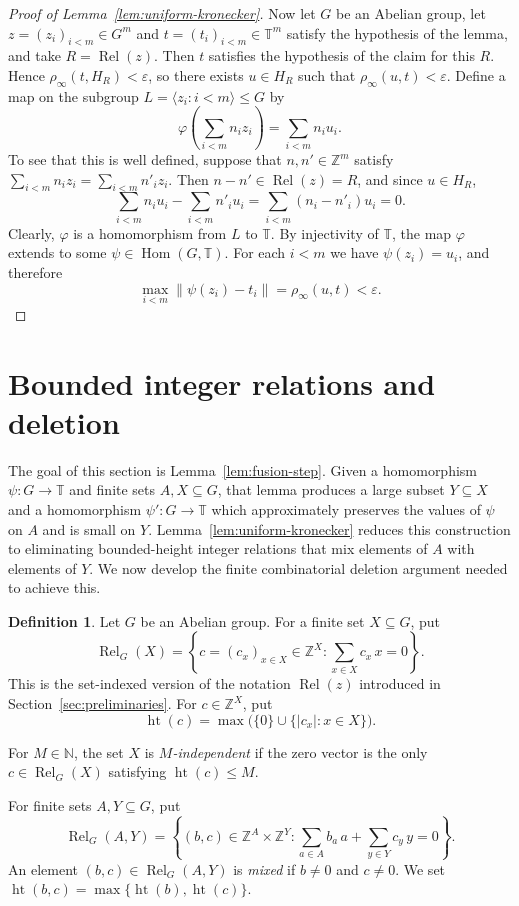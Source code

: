 \documentclass[11pt]{amsart}
\theoremstyle{definition}
\newtheorem{definition}[theorem]{Definition}
\newcommand{\T}{\mathbb T}
\newcommand{\N}{\mathbb N}
\newcommand{\Z}{\mathbb Z}
\newcommand{\Hom}{\operatorname{Hom}}
\newcommand{\Rel}{\operatorname{Rel}}
\newcommand{\htop}{\operatorname{ht}}
\begin{document}
\begin{proof}[Proof of Lemma~\ref{lem:uniform-kronecker}]
Now let $G$ be an Abelian group, let
$z=(z_i)_{i<m}\in G^m$ and
$t=(t_i)_{i<m}\in\T^m$ satisfy the hypothesis of the lemma, and take
$R=\Rel(z)$.
Then $t$ satisfies the hypothesis of the claim for this $R$.  Hence $\rho_\infty(t,H_R)<\varepsilon$, so there
exists $u\in H_R$ such that
$\rho_\infty(u,t)<\varepsilon$.  Define a map on the subgroup
$L=\langle z_i:i<m\rangle\leq G$ by
\[
 \varphi\left(\sum_{i<m}n_i z_i\right)=\sum_{i<m}n_i u_i.
\]
To see that this is well defined, suppose that $n,n'\in\Z^m$ satisfy
$\sum_{i<m}n_i z_i=\sum_{i<m}n'_i z_i$.  Then $n-n'\in\Rel(z)=R$, and since
$u\in H_R$,
\[
 \sum_{i<m}n_i u_i-\sum_{i<m}n'_i u_i
 =\sum_{i<m}(n_i-n'_i)u_i=0.
\]
Clearly, $\varphi$ is a homomorphism from $L$ to $\T$.
By injectivity of $\T$, the map $\varphi$ extends to some
$\psi\in\Hom(G,\T)$.  For each $i<m$ we have $\psi(z_i)=u_i$, and therefore
\[
 \max_{i<m}\|\psi(z_i)-t_i\|=\rho_\infty(u,t)<\varepsilon.
\]
\end{proof}

\section{Bounded integer relations and deletion}

The goal of this section is Lemma~\ref{lem:fusion-step}.  Given a
homomorphism $\psi:G\to\T$ and finite sets $A,X\subseteq G$, that lemma
produces a large subset $Y\subseteq X$ and a homomorphism $\psi':G\to\T$
which approximately preserves the values of $\psi$ on $A$ and is small on
$Y$.  Lemma~\ref{lem:uniform-kronecker} reduces this construction to
eliminating bounded-height integer relations that mix elements of $A$ with
elements of $Y$.  We now develop the finite combinatorial deletion argument
needed to achieve this.

\begin{definition}
Let $G$ be an Abelian group.  For a finite set $X\subseteq G$, put
\[
 \Rel_G(X)=
 \left\{c=(c_x)_{x\in X}\in\Z^X:
 \sum_{x\in X}c_x\,x=0\right\}.
\]
This is the set-indexed version of the notation $\Rel(z)$ introduced in
Section~\ref{sec:preliminaries}.
For $c\in\Z^X$, put
\[
 \htop(c)=\max\bigl(\{0\}\cup\{|c_x|:x\in X\}\bigr).
\]

For $M\in\N$, the set $X$ is \emph{$M$-independent} if the zero vector is
the only $c\in\Rel_G(X)$ satisfying $\htop(c)\leq M$.

For finite sets $A,Y\subseteq G$, put
\[
 \Rel_G(A,Y)=
 \left\{(b,c)\in\Z^A\times\Z^Y:
 \sum_{a\in A}b_a\,a+\sum_{y\in Y}c_y\,y=0\right\}.
\]
An element $(b,c)\in\Rel_G(A,Y)$ is \emph{mixed} if $b\neq0$ and
$c\neq0$.  We set $\htop(b,c)=\max\{\htop(b),\htop(c)\}$.
\end{definition}
\end{document}
